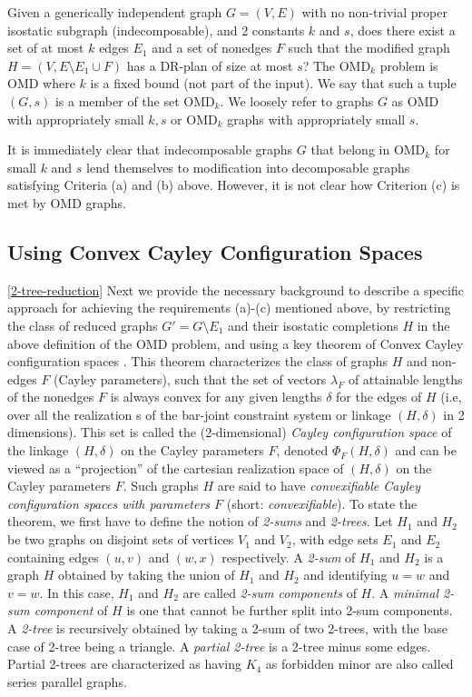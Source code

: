 \medskip{} Given a generically
independent graph $G = (V,E)$
with no non-trivial proper isostatic subgraph (indecomposable), and 2 constants $k$ and $s$,
does there exist a set of at most $k$  edges $E_1$ and a set of nonedges $F$
such that the modified graph $H = (V, E\setminus E_1 \cup F)$ has a DR-plan
of size at most $s$?  The OMD$_k$ problem is  OMD where $k$ is a fixed bound (not
part of the input).   We say that such a tuple $(G,s)$ is a member of the
set OMD$_k$. We loosely refer to graphs $G$ as OMD with appropriately small $k,s$ or OMD$_k$ graphs
with appropriately small $s$.


It is immediately clear that indecomposable graphs $G$ that belong in OMD$_k$ for small $k$ and
$s$  lend themselves to modification  into decomposable graphs
satisfying Criteria (a) and (b) above.
However, it is not clear how Criterion (c) is met by OMD graphs.
%
\subsection{Using Convex Cayley Configuration Spaces}
%
\ref{2-tree-reduction}
Next we provide the necessary background to describe a specific approach for achieving the requirements
(a)-(c) mentioned above, by restricting the class of reduced graphs $G' =
G\setminus E_1$ and their isostatic completions $H$ in the above definition of the
OMD problem, and using a key theorem of Convex Cayley configuration
spaces \cite{XX}. This theorem characterizes the class of graphs $H$ and non-edges $F$ (Cayley
parameters), such that the set of vectors $\lambda_F$ of  attainable lengths of
the nonedges $F$
is always convex for any
given lengths $\delta$ for the edges of $H$ (i.e, over all the realization
s of the bar-joint constraint system or linkage $(H,\delta)$ in 2 dimensions).
This set is called the (2-dimensional) {\em Cayley configuration space}
of the linkage $(H,\delta)$ on the Cayley parameters $F$, denoted
$\Phi_F(H,\delta)$ and can be viewed as a ``projection'' of the cartesian
realization space of $(H,\delta)$ on the Cayley parameters $F$.
Such graphs $H$ are said to have {\em convexifiable Cayley configuration spaces
with parameters $F$} (short: {\em convexifiable}). To state the theorem, we first have to define the
notion of {\em 2-sums} and {\em 2-trees}.
Let $H_1$ and $H_2$ be two graphs on disjoint sets of vertices $V_1$ and
$V_2$, with edge sets $E_1$ and $E_2$ containing edges $(u,v)$ and $(w,x)$
respectively.  A {\em 2-sum} of
$H_1$ and $H_2$ is a
graph $H$  obtained by taking the union of $H_1$ and $H_2$ and identifying $u=w$ and $v=w$.
In this case, $H_1$ and $H_2$ are called {\em 2-sum components} of $H$.
A {\em minimal 2-sum component} of $H$ is  one that cannot be further split
into 2-sum components.
A {\em 2-tree} is recursively obtained by taking
a 2-sum of two 2-trees, with the base case of 2-tree being a triangle.
A {\em partial 2-tree} is a 2-tree minus some edges.
Partial 2-trees are characterized as having $K_4$ as forbidden minor are also called series parallel graphs.

